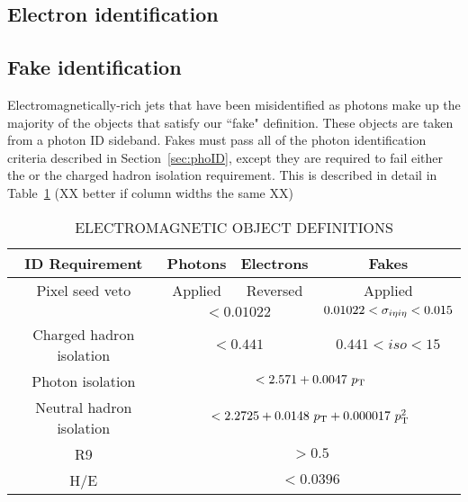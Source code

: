 \subsection{Electron identification}
\label{sec:eleID}


\subsection{Fake identification}
\label{sec:fakeID}
Electromagnetically-rich jets that have been misidentified as photons make up the majority of the objects 
that satisfy our ``fake" definition. These objects are taken from a photon ID sideband. Fakes must
pass all of the photon identification criteria described in Section~\ref{sec:phoID}, except they are required to
fail either the \sigmaietaieta or the charged hadron isolation requirement. This is described in detail in Table~\ref{tab:ID}
(XX better if column widths the same XX)

\begin{table}[ht]
    \caption{ELECTROMAGNETIC OBJECT DEFINITIONS}
    \centering
    \begin{tabular}{ | c | c c c |}
        \hline
        	\hline
        \textbf{ID Requirement} & \textbf{Photons} & \textbf{Electrons} & \textbf{Fakes} \\ [0.5ex]
        \hline
        	Pixel seed veto    & \multicolumn{1}{c|}{Applied} & \multicolumn{1}{c|}{Reversed} & \multicolumn{1}{c|}{Applied}\\
	\hline
	\sigmaietaieta   & \multicolumn{2}{c|}{$ < 0.01022 $} & $0.01022 < \sigma_{i\eta i \eta}  < 0.015 $\\
	Charged hadron isolation & \multicolumn{2}{c|}{$ < 0.441$} & $ 0.441 < iso < 15$\\
	\hline
	Photon isolation & \multicolumn{3}{c|}{$ < 2.571 +0.0047~p_{\mathrm{T}}$} \\
	Neutral hadron isolation   &  \multicolumn{3}{c|}{$ < 2.2725 + 0.0148~p_{\mathrm{T}}+0.000017~p_{\mathrm{T}}^2$} \\
        R9                      & \multicolumn{3}{c|}{$ > 0.5$} \\
        H/E                     & \multicolumn{3}{c|}{$ < 0.0396$} \\
           \hline
           \hline
    \end{tabular}
    \label{tab:ID}
\end{table}

